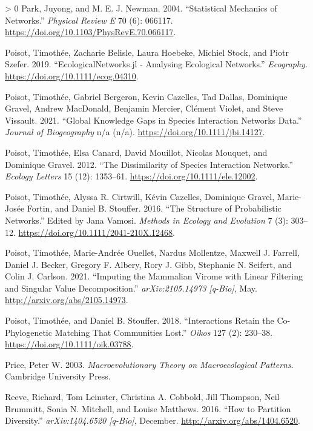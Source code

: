 \documentclass[11pt]{article}
\newlength{\cslhangindent}
\newenvironment{CSLReferences}[3] %
 {%
  \setlength{\parindent}{0pt}
  \ifodd #1 \everypar{\setlength{\hangindent}{\cslhangindent}}\ignorespaces\fi
  \ifnum #2 > 0
  \setlength{\parskip}{#2\baselineskip}
  \fi
 }%
 {}
\begin{document}
\begin{CSLReferences}{1}{0}
\leavevmode\hypertarget{ref-Park2004StaMec}{}%
Park, Juyong, and M. E. J. Newman. 2004. {``Statistical Mechanics of
Networks.''} \emph{Physical Review E} 70 (6): 066117.
\url{https://doi.org/10.1103/PhysRevE.70.066117}.

\leavevmode\hypertarget{ref-Poisot2019EcoJl}{}%
Poisot, Timothée, Zacharie Belisle, Laura Hoebeke, Michiel Stock, and
Piotr Szefer. 2019. {``EcologicalNetworks.jl - Analysing Ecological
Networks.''} \emph{Ecography}. \url{https://doi.org/10.1111/ecog.04310}.

\leavevmode\hypertarget{ref-Poisot2021GloKno}{}%
Poisot, Timothée, Gabriel Bergeron, Kevin Cazelles, Tad Dallas,
Dominique Gravel, Andrew MacDonald, Benjamin Mercier, Clément Violet,
and Steve Vissault. 2021. {``Global Knowledge Gaps in Species
Interaction Networks Data.''} \emph{Journal of Biogeography} n/a (n/a).
\url{https://doi.org/10.1111/jbi.14127}.

\leavevmode\hypertarget{ref-Poisot2012DisSpea}{}%
Poisot, Timothée, Elsa Canard, David Mouillot, Nicolas Mouquet, and
Dominique Gravel. 2012. {``The Dissimilarity of Species Interaction
Networks.''} \emph{Ecology Letters} 15 (12): 1353--61.
\url{https://doi.org/10.1111/ele.12002}.

\leavevmode\hypertarget{ref-Poisot2016StrPro}{}%
Poisot, Timothée, Alyssa R. Cirtwill, Kévin Cazelles, Dominique Gravel,
Marie-Josée Fortin, and Daniel B. Stouffer. 2016. {``The Structure of
Probabilistic Networks.''} Edited by Jana Vamosi. \emph{Methods in
Ecology and Evolution} 7 (3): 303--12.
\url{https://doi.org/10.1111/2041-210X.12468}.

\leavevmode\hypertarget{ref-Poisot2021ImpMam}{}%
Poisot, Timothée, Marie-Andrée Ouellet, Nardus Mollentze, Maxwell J.
Farrell, Daniel J. Becker, Gregory F. Albery, Rory J. Gibb, Stephanie N.
Seifert, and Colin J. Carlson. 2021. {``Imputing the Mammalian Virome
with Linear Filtering and Singular Value Decomposition.''}
\emph{arXiv:2105.14973 {[}q-Bio{]}}, May.
\url{http://arxiv.org/abs/2105.14973}.

\leavevmode\hypertarget{ref-Poisot2018IntRet}{}%
Poisot, Timothée, and Daniel B. Stouffer. 2018. {``Interactions Retain
the Co-Phylogenetic Matching That Communities Lost.''} \emph{Oikos} 127
(2): 230--38. \url{https://doi.org/10.1111/oik.03788}.

\leavevmode\hypertarget{ref-Price2003MacThe}{}%
Price, Peter W. 2003. \emph{Macroevolutionary Theory on Macroecological
Patterns}. Cambridge University Press.

\leavevmode\hypertarget{ref-Reeve2016HowPar}{}%
Reeve, Richard, Tom Leinster, Christina A. Cobbold, Jill Thompson, Neil
Brummitt, Sonia N. Mitchell, and Louise Matthews. 2016. {``How to
Partition Diversity.''} \emph{arXiv:1404.6520 {[}q-Bio{]}}, December.
\url{http://arxiv.org/abs/1404.6520}.


\end{CSLReferences}
\end{document}
